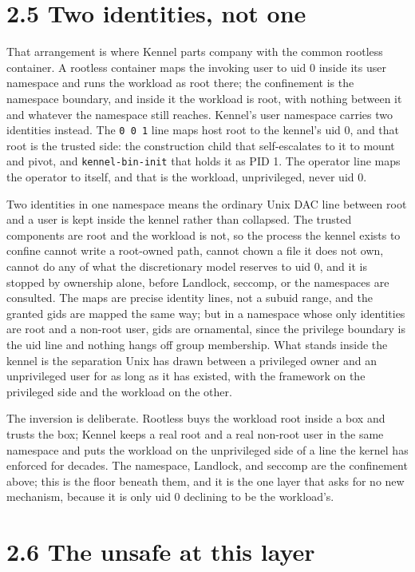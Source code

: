 \hypertarget{two-identities-not-one}{%
\section{2.5 Two identities, not one}\label{two-identities-not-one}}

That arrangement is where Kennel parts company with the common rootless
container. A rootless container maps the invoking user to uid 0 inside
its user namespace and runs the workload as root there; the confinement
is the namespace boundary, and inside it the workload is root, with
nothing between it and whatever the namespace still reaches. Kennel's
user namespace carries two identities instead. The \texttt{0\ 0\ 1} line
maps host root to the kennel's uid 0, and that root is the trusted side:
the construction child that self-escalates to it to mount and pivot, and
\texttt{kennel-bin-init} that holds it as PID 1. The operator line maps
the operator to itself, and that is the workload, unprivileged, never
uid 0.

Two identities in one namespace means the ordinary Unix DAC line between
root and a user is kept inside the kennel rather than collapsed. The
trusted components are root and the workload is not, so the process the
kennel exists to confine cannot write a root-owned path, cannot chown a
file it does not own, cannot do any of what the discretionary model
reserves to uid 0, and it is stopped by ownership alone, before
Landlock, seccomp, or the namespaces are consulted. The maps are precise
identity lines, not a subuid range, and the granted gids are mapped the
same way; but in a namespace whose only identities are root and a
non-root user, gids are ornamental, since the privilege boundary is the
uid line and nothing hangs off group membership. What stands inside the
kennel is the separation Unix has drawn between a privileged owner and
an unprivileged user for as long as it has existed, with the framework
on the privileged side and the workload on the other.

The inversion is deliberate. Rootless buys the workload root inside a
box and trusts the box; Kennel keeps a real root and a real non-root
user in the same namespace and puts the workload on the unprivileged
side of a line the kernel has enforced for decades. The namespace,
Landlock, and seccomp are the confinement above; this is the floor
beneath them, and it is the one layer that asks for no new mechanism,
because it is only uid 0 declining to be the workload's.

\hypertarget{the-unsafe-at-this-layer}{%
\section{2.6 The unsafe at this layer}\label{the-unsafe-at-this-layer}}

